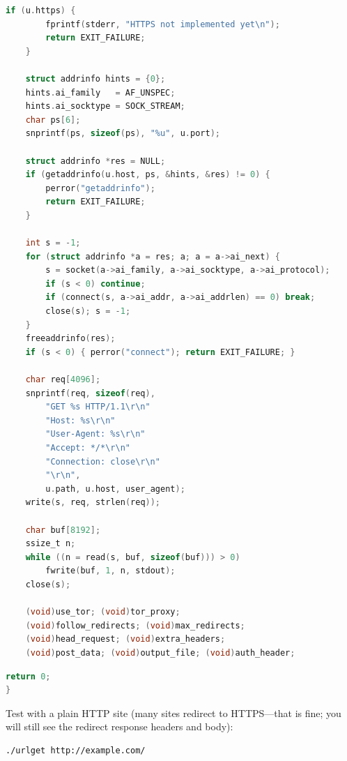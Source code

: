 \begin{lstlisting}[style=newcode,language=C,firstnumber=last]
    if (u.https) {
        fprintf(stderr, "HTTPS not implemented yet\n");
        return EXIT_FAILURE;
    }

    struct addrinfo hints = {0};
    hints.ai_family   = AF_UNSPEC;
    hints.ai_socktype = SOCK_STREAM;
    char ps[6];
    snprintf(ps, sizeof(ps), "%u", u.port);

    struct addrinfo *res = NULL;
    if (getaddrinfo(u.host, ps, &hints, &res) != 0) {
        perror("getaddrinfo");
        return EXIT_FAILURE;
    }

    int s = -1;
    for (struct addrinfo *a = res; a; a = a->ai_next) {
        s = socket(a->ai_family, a->ai_socktype, a->ai_protocol);
        if (s < 0) continue;
        if (connect(s, a->ai_addr, a->ai_addrlen) == 0) break;
        close(s); s = -1;
    }
    freeaddrinfo(res);
    if (s < 0) { perror("connect"); return EXIT_FAILURE; }

    char req[4096];
    snprintf(req, sizeof(req),
        "GET %s HTTP/1.1\r\n"
        "Host: %s\r\n"
        "User-Agent: %s\r\n"
        "Accept: */*\r\n"
        "Connection: close\r\n"
        "\r\n",
        u.path, u.host, user_agent);
    write(s, req, strlen(req));

    char buf[8192];
    ssize_t n;
    while ((n = read(s, buf, sizeof(buf))) > 0)
        fwrite(buf, 1, n, stdout);
    close(s);

    (void)use_tor; (void)tor_proxy;
    (void)follow_redirects; (void)max_redirects;
    (void)head_request; (void)extra_headers;
    (void)post_data; (void)output_file; (void)auth_header;
\end{lstlisting}
\begin{lstlisting}[style=oldcode,language=C,firstnumber=last]
    return 0;
}
\end{lstlisting}
\FullSourceStop

Test with a plain HTTP site (many sites redirect to HTTPS---that is fine; you
will still see the redirect response headers and body):

\begin{lstlisting}[style=snippet,language=bash]
./urlget http://example.com/
\end{lstlisting}
